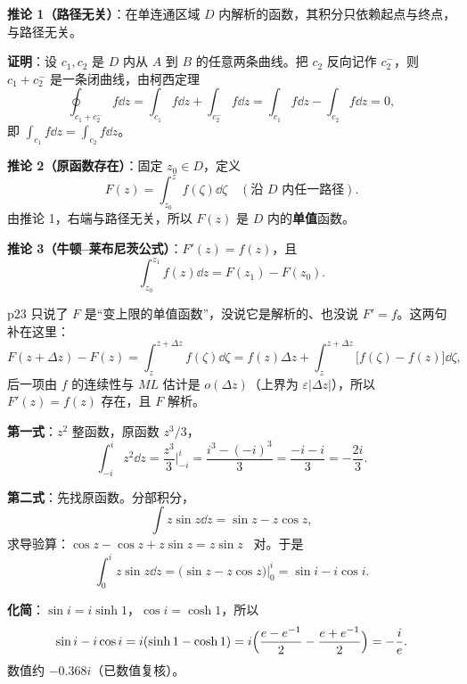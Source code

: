 
\textbf{推论 1（路径无关）}：在单连通区域 $D$ 内解析的函数，其积分只依赖起点与终点，与路径无关。

\textbf{证明}：设 $c_1,c_2$ 是 $D$ 内从 $A$ 到 $B$ 的任意两条曲线。把 $c_2$ 反向记作 $c_2^{-}$，则 $c_1+c_2^{-}$ 是一条闭曲线，由柯西定理
\[ \oint_{c_1+c_2^{-}}f\dd z=\int_{c_1}f\dd z+\int_{c_2^{-}}f\dd z=\int_{c_1}f\dd z-\int_{c_2}f\dd z=0 , \]
即 $\displaystyle\int_{c_1}f\dd z=\int_{c_2}f\dd z$。

\textbf{推论 2（原函数存在）}：固定 $z_0\in D$，定义
\[ F(z)=\int_{z_0}^{z}f(\zeta)\dd\zeta\quad(\text{沿 }D\text{ 内任一路径}) . \]
由推论 1，右端与路径无关，所以 $F(z)$ 是 $D$ 内的\textbf{单值}函数。

\textbf{推论 3（牛顿--莱布尼茨公式）}：$F'(z)=f(z)$，且
\begin{equation}\label{eq:NL}
\int_{z_0}^{z_1}f(z)\dd z=F(z_1)-F(z_0).
\end{equation}

p23 只说了 $F$ 是“变上限的单值函数”，没说它是解析的、也没说 $F'=f$。这两句补在这里：
\[ F(z+\Delta z)-F(z)=\int_z^{z+\Delta z}f(\zeta)\dd\zeta
=f(z)\Delta z+\int_z^{z+\Delta z}\bigl[f(\zeta)-f(z)\bigr]\dd\zeta , \]
后一项由 $f$ 的连续性与 $ML$ 估计是 $o(\Delta z)$（上界为 $\varepsilon|\Delta z|$），所以 $F'(z)=f(z)$ 存在，且 $F$ 解析。



\qbreak
{}

\textbf{第一式}：$z^{2}$ 整函数，原函数 $z^{3}/3$，
\[ \int_{-i}^{i}z^{2}\dd z=\frac{z^{3}}{3}\Big|_{-i}^{i}
=\frac{i^{3}-(-i)^{3}}{3}=\frac{-i-i}{3}=-\frac{2i}{3} . \]

\textbf{第二式}：先找原函数。分部积分，
\[ \int z\sin z\dd z=\sin z-z\cos z , \]
求导验算：$\cos z-\cos z+z\sin z=z\sin z$ \ 对。于是
\[ \int_0^{i}z\sin z\dd z=\bigl(\sin z-z\cos z\bigr)\Big|_0^{i}=\sin i-i\cos i . \]

\textbf{化简}：$\sin i=i\sinh 1$，$\cos i=\cosh 1$，所以
\[ \sin i-i\cos i=i(\sinh1-\cosh1)=i\Bigl(\frac{e-e^{-1}}{2}-\frac{e+e^{-1}}{2}\Bigr)=-\frac{i}{e} . \]
数值约 $-0.368i$（已数值复核）。

